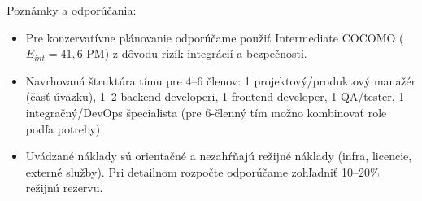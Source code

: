 Poznámky a odporúčania:
\begin{itemize}
\item Pre konzervatívne plánovanie odporúčame použiť Intermediate COCOMO ($E_{int}=41{,}6$ PM) z dôvodu rizík integrácií a bezpečnosti.
\item Navrhovaná štruktúra tímu pre $4$--$6$ členov: 1 projektový/produktový manažér (časť úväzku), 1--2 backend developeri, 1 frontend developer, 1 QA/tester, 1 integračný/DevOps špecialista (pre 6-členný tím možno kombinovať role podľa potreby).
\item Uvádzané náklady sú orientačné a nezahŕňajú režijné náklady (infra, licencie, externé služby). Pri detailnom rozpočte odporúčame zohľadniť 10--20\% režijnú rezervu.
\end{itemize}

